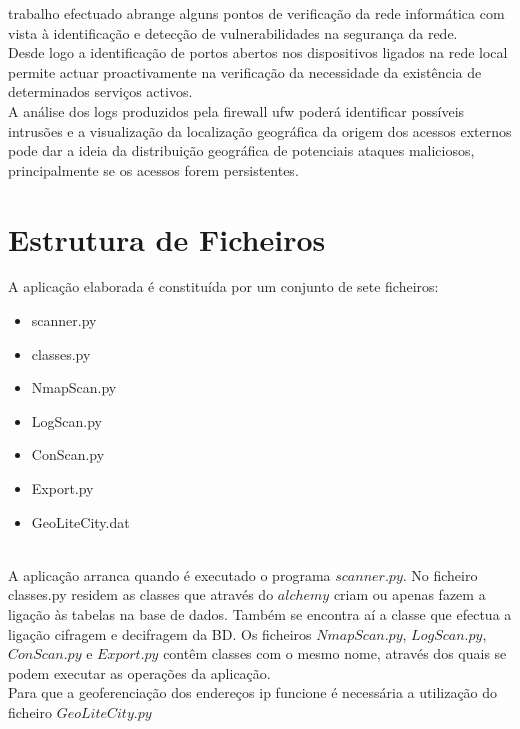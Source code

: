 \documentclass[10pt,journal,cspaper,compsoc]{IEEEtran}
\begin{document}
% 
% 
% 
% 
 trabalho efectuado abrange alguns pontos de verificação da rede informática com vista à identificação e detecção de vulnerabilidades na segurança da rede.\\
Desde logo a identificação de portos abertos nos dispositivos ligados na rede local permite actuar proactivamente na verificação da necessidade da existência de determinados serviços activos.\\
A análise dos logs produzidos pela firewall ufw poderá identificar possíveis intrusões e a visualização da localização geográfica da origem dos acessos externos pode dar a ideia da distribuição geográfica de potenciais ataques maliciosos, principalmente se os acessos forem persistentes.\\



\section{Estrutura de Ficheiros}
A aplicação elaborada é constituída por um conjunto de sete ficheiros:
\begin{itemize}
	\item scanner.py
	\item classes.py
	\item NmapScan.py
	\item LogScan.py
	\item ConScan.py
	\item Export.py
	\item GeoLiteCity.dat
\end{itemize}\\
A aplicação arranca quando é executado o programa $scanner.py$. No ficheiro classes.py residem as classes que através do $alchemy$\cite{alchemy} criam ou apenas fazem a ligação às tabelas na base de dados. Também se encontra aí a classe que efectua a ligação cifragem e decifragem da BD. Os ficheiros $NmapScan.py$, $LogScan.py$, $ConScan.py$ e $Export.py$ contêm classes com o mesmo nome, através dos quais se podem executar as operações da aplicação.\\
Para que a geoferenciação dos endereços ip funcione é necessária a utilização do ficheiro $GeoLiteCity.py$
\end{document}
